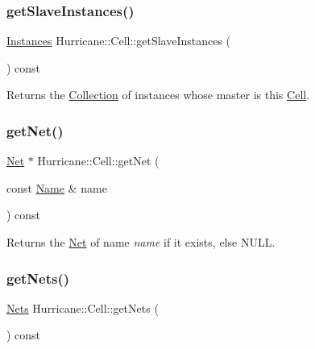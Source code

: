 \subsubsection{\texorpdfstring{get\+Slave\+Instances()}{getSlaveInstances()}}
{\footnotesize\ttfamily \mbox{\hyperlink{namespaceHurricane_ac9436b03a2926f34ad6863deae2baadc}{Instances}} Hurricane\+::\+Cell\+::get\+Slave\+Instances (\begin{DoxyParamCaption}{ }\end{DoxyParamCaption}) const}

Returns the \mbox{\hyperlink{classHurricane_1_1Collection}{Collection}} of instances whose master is this \mbox{\hyperlink{classHurricane_1_1Cell}{Cell}}. \mbox{\label{classHurricane_1_1Cell_a63cb19881279b5af0a4e7dae707ef1bd}} 
\subsubsection{\texorpdfstring{get\+Net()}{getNet()}}
{\footnotesize\ttfamily \mbox{\hyperlink{classHurricane_1_1Net}{Net}} $\ast$ Hurricane\+::\+Cell\+::get\+Net (\begin{DoxyParamCaption}\item[{const \mbox{\hyperlink{classHurricane_1_1Name}{Name}} \&}]{name }\end{DoxyParamCaption}) const}

Returns the \mbox{\hyperlink{classHurricane_1_1Net}{Net}} of name {\itshape name} if it exists, else {\ttfamily N\+U\+LL}. \mbox{\label{classHurricane_1_1Cell_a8b4728abe83e9ec21d7bee1154218279}} 
\subsubsection{\texorpdfstring{get\+Nets()}{getNets()}}
{\footnotesize\ttfamily \mbox{\hyperlink{namespaceHurricane_a3404a8b17130a1824f4a281704b04df7}{Nets}} Hurricane\+::\+Cell\+::get\+Nets (\begin{DoxyParamCaption}{ }\end{DoxyParamCaption}) const\hspace{0.3cm}{\ttfamily [inline]}}


